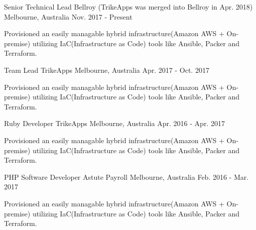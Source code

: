 

\begin{cventries}

  \cventry
    {Senior Technical Lead} %
    {Bellroy (TrikeApps was merged into Bellroy in Apr. 2018)} %
    {Melbourne, Australia} %
    {Nov. 2017 - Present} %
    {
      \begin{cvitems} %
        \item {Provisioned an easily managable hybrid infrastructure(Amazon AWS + On-premise) utilizing IaC(Infrastructure as Code) tools like Ansible, Packer and Terraform.}
      \end{cvitems}
    }

  \cventry
    {Team Lead} %
    {TrikeApps} %
    {Melbourne, Australia} %
    {Apr. 2017 - Oct. 2017} %
    {
      \begin{cvitems} %
        \item {Provisioned an easily managable hybrid infrastructure(Amazon AWS + On-premise) utilizing IaC(Infrastructure as Code) tools like Ansible, Packer and Terraform.}
      \end{cvitems}
    }

  \cventry
    {Ruby Developer} %
    {TrikeApps} %
    {Melbourne, Australia} %
    {Apr. 2016 - Apr. 2017} %
    {
      \begin{cvitems} %
        \item {Provisioned an easily managable hybrid infrastructure(Amazon AWS + On-premise) utilizing IaC(Infrastructure as Code) tools like Ansible, Packer and Terraform.}
      \end{cvitems}
    }

  \cventry
    {PHP Software Developer} %
    {Astute Payroll} %
    {Melbourne, Australia} %
    {Feb. 2016 - Mar. 2017} %
    {
      \begin{cvitems} %
        \item {Provisioned an easily managable hybrid infrastructure(Amazon AWS + On-premise) utilizing IaC(Infrastructure as Code) tools like Ansible, Packer and Terraform.}
      \end{cvitems}
    }


\end{cventries}
